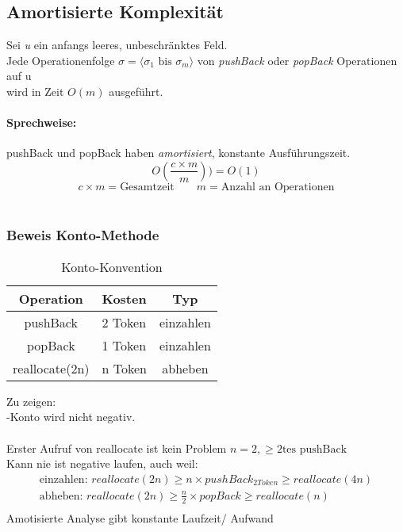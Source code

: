 \documentclass[a4paper]{scrartcl}
\begin{document}
			\subsection{Amortisierte Komplexität}
				Sei \emph{u} ein anfangs leeres, unbeschränktes Feld.\\
				Jede Operationenfolge \emph{\( \sigma = \langle \sigma_1 \text{ bis } \sigma_m \rangle \)} von \emph{pushBack} oder \emph{popBack} Operationen auf u\\
				wird in Zeit \emph{\( O(m) \)} ausgeführt.\\
				\paragraph{Sprechweise:}
					pushBack und popBack haben \emph{amortisiert}, konstante Ausführungszeit.\\
					\[ O( \frac{c \times m}{m}) ) = O(1) \]
					\[ c \times m = \text{Gesamtzeit} \qquad m = \text{Anzahl an Operationen} \]\\
				
		\subsubsection{Beweis Konto-Methode}
			\begin{table}
				\begin{tabular}{ c | l | c}
					Operation & Kosten & Typ \\ \hline
					pushBack & 2 Token & einzahlen \\
					popBack & 1 Token & einzahlen \\
					reallocate(2n) & n Token & abheben\\
				\end{tabular}
				\caption{Konto-Konvention}
			\end{table}
		
			Zu zeigen: \\
			-Konto wird nicht negativ.\\
			\\
			Erster Aufruf von reallocate ist kein Problem \( n=2, \geq 2\text{tes pushBack} \) \\
			Kann nie ist negative laufen, auch weil:\\
			\begin{align*}
				\text{einzahlen: } reallocate(2n) \geq n \times pushBack_{2Token} \geq reallocate(4n)\\
				\text{abheben: } reallocate(2n) \geq \frac{n}{2} \times popBack \geq reallocate(n)\\
			\end{align*}
			Amotisierte Analyse gibt konstante Laufzeit/ Aufwand \\
\end{document}
